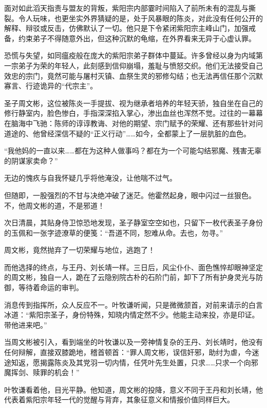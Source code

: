 \vspace{2em}

面对如此滔天指责与盟友的背叛，紫阳宗内部霎时间陷入了前所未有的混乱与撕裂。令人玩味，也更坐实外界猜疑的是，处于风暴眼的陈炎，对此没有任何公开的解释、辩驳或反击，仿佛默认了一切。他只是下令紧闭紫阳宗主峰山门，加强戒备，约束弟子不得随意外出，但这种沉默的龟缩，在外界看来无异于心虚认罪。

恐慌与失望，如同瘟疫般在庞大的紫阳宗弟子群体中蔓延。许多曾经以身为内域第一宗弟子为荣的年轻人，此刻感到信仰崩塌，羞耻与愤怒交织。他们无法接受自己效忠的宗门，竟然可能与屠村灭镇、血祭生灵的邪修勾结；也无法再信任那个沉默寡言、行迹诡异的“代宗主”。

圣子周文彬，这位被陈炎一手提拔、视为继承者培养的年轻天骄，独自坐在自己的修行静室内，脸色惨白，手指深深掐入掌心，渗出血丝也浑然不觉。过往的一幕幕在脑海中飞驰：陈师的谆谆教诲、对他的期望、宗门赋予的荣耀、还有那些针对问道途的、他曾经深信不疑的“正义行动”……如今，全都蒙上了一层肮脏的血色。

“我他妈的一直以来……都在为这种人做事吗？都在为一个可能勾结邪魔、残害无辜的阴谋家卖命？”

无边的愧疚与自我怀疑几乎将他淹没，让他喘不过气。

但随即，一股强烈的不甘与决绝冲破了迷茫。他霍然起身，眼中闪过一丝狠色。不，他周文彬的道，不是邪道！

次日清晨，其贴身侍卫惊恐地发现，圣子静室空空如也，只留下一枚代表圣子身份的玉佩和一张字迹潦草的便笺：“吾道不同，恕难从命。去也，勿寻。”

周文彬，竟然抛弃了一切荣耀与地位，逃跑了！

\vspace{2em}

而他选择的终点，与王丹、刘长靖一样。三日后，风尘仆仆、面色憔悴却眼神坚定的周文彬，独自一人，跪在了云隐别院古朴的石阶门前，卸下了所有护身灵光与防御，等待着命运的审判。

消息传到指挥所，众人反应不一。叶牧谦听闻，只是微微颔首，对前来请示的白言冰道：“紫阳宗圣子，身份特殊，知晓内情定然不少。他能主动来投，亦是印证。带他进来吧。”

当周文彬被引入，看到端坐的叶牧谦以及一旁神情复杂的王丹、刘长靖时，他没有任何辩解，直接双膝跪地，稽首顿首：“罪人周文彬，误信奸邪，助纣为虐，今迷途知返，愿揭露陈炎及其党羽一切内情，任凭叶先生处置，只求……只求一个向邪魔挥剑、赎罪的机会！”

叶牧谦看着他，目光平静。他知道，周文彬的投降，意义不同于王丹和刘长靖，他代表着紫阳宗年轻一代的觉醒与背弃，其象征意义和情报价值同样巨大。

